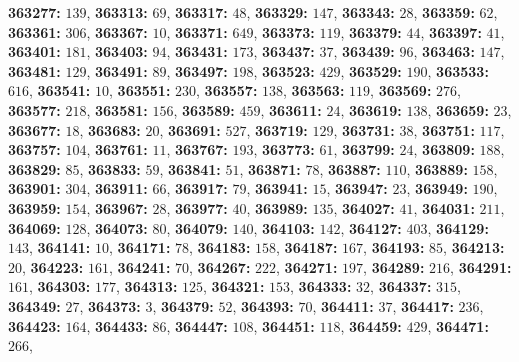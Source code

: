 \textsf{\bfseries 363277:} $139$, \textsf{\bfseries 363313:} $69$, \textsf{\bfseries 363317:} $48$, \textsf{\bfseries 363329:} $147$, \textsf{\bfseries 363343:} $28$, \textsf{\bfseries 363359:} $62$, \textsf{\bfseries 363361:} $306$, \textsf{\bfseries 363367:} $10$, \textsf{\bfseries 363371:} $649$, \textsf{\bfseries 363373:} $119$, \textsf{\bfseries 363379:} $44$, \textsf{\bfseries 363397:} $41$, \textsf{\bfseries 363401:} $181$, \textsf{\bfseries 363403:} $94$, \textsf{\bfseries 363431:} $173$, \textsf{\bfseries 363437:} $37$, \textsf{\bfseries 363439:} $96$, \textsf{\bfseries 363463:} $147$, \textsf{\bfseries 363481:} $129$, \textsf{\bfseries 363491:} $89$, \textsf{\bfseries 363497:} $198$, \textsf{\bfseries 363523:} $429$, \textsf{\bfseries 363529:} $190$, \textsf{\bfseries 363533:} $616$, \textsf{\bfseries 363541:} $10$, \textsf{\bfseries 363551:} $230$, \textsf{\bfseries 363557:} $138$, \textsf{\bfseries 363563:} $119$, \textsf{\bfseries 363569:} $276$, \textsf{\bfseries 363577:} $218$, \textsf{\bfseries 363581:} $156$, \textsf{\bfseries 363589:} $459$, \textsf{\bfseries 363611:} $24$, \textsf{\bfseries 363619:} $138$, \textsf{\bfseries 363659:} $23$, \textsf{\bfseries 363677:} $18$, \textsf{\bfseries 363683:} $20$, \textsf{\bfseries 363691:} $527$, \textsf{\bfseries 363719:} $129$, \textsf{\bfseries 363731:} $38$, \textsf{\bfseries 363751:} $117$, \textsf{\bfseries 363757:} $104$, \textsf{\bfseries 363761:} $11$, \textsf{\bfseries 363767:} $193$, \textsf{\bfseries 363773:} $61$, \textsf{\bfseries 363799:} $24$, \textsf{\bfseries 363809:} $188$, \textsf{\bfseries 363829:} $85$, \textsf{\bfseries 363833:} $59$, \textsf{\bfseries 363841:} $51$, \textsf{\bfseries 363871:} $78$, \textsf{\bfseries 363887:} $110$, \textsf{\bfseries 363889:} $158$, \textsf{\bfseries 363901:} $304$, \textsf{\bfseries 363911:} $66$, \textsf{\bfseries 363917:} $79$, \textsf{\bfseries 363941:} $15$, \textsf{\bfseries 363947:} $23$, \textsf{\bfseries 363949:} $190$, \textsf{\bfseries 363959:} $154$, \textsf{\bfseries 363967:} $28$, \textsf{\bfseries 363977:} $40$, \textsf{\bfseries 363989:} $135$, \textsf{\bfseries 364027:} $41$, \textsf{\bfseries 364031:} $211$, \textsf{\bfseries 364069:} $128$, \textsf{\bfseries 364073:} $80$, \textsf{\bfseries 364079:} $140$, \textsf{\bfseries 364103:} $142$, \textsf{\bfseries 364127:} $403$, \textsf{\bfseries 364129:} $143$, \textsf{\bfseries 364141:} $10$, \textsf{\bfseries 364171:} $78$, \textsf{\bfseries 364183:} $158$, \textsf{\bfseries 364187:} $167$, \textsf{\bfseries 364193:} $85$, \textsf{\bfseries 364213:} $20$, \textsf{\bfseries 364223:} $161$, \textsf{\bfseries 364241:} $70$, \textsf{\bfseries 364267:} $222$, \textsf{\bfseries 364271:} $197$, \textsf{\bfseries 364289:} $216$, \textsf{\bfseries 364291:} $161$, \textsf{\bfseries 364303:} $177$, \textsf{\bfseries 364313:} $125$, \textsf{\bfseries 364321:} $153$, \textsf{\bfseries 364333:} $32$, \textsf{\bfseries 364337:} $315$, \textsf{\bfseries 364349:} $27$, \textsf{\bfseries 364373:} $3$, \textsf{\bfseries 364379:} $52$, \textsf{\bfseries 364393:} $70$, \textsf{\bfseries 364411:} $37$, \textsf{\bfseries 364417:} $236$, \textsf{\bfseries 364423:} $164$, \textsf{\bfseries 364433:} $86$, \textsf{\bfseries 364447:} $108$, \textsf{\bfseries 364451:} $118$, \textsf{\bfseries 364459:} $429$, \textsf{\bfseries 364471:} $266$, 
